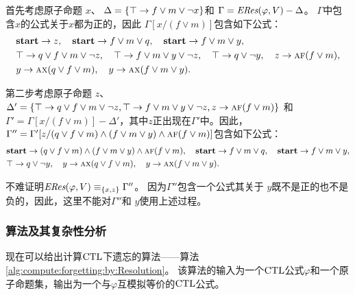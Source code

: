 \begin{example}\label{examp:Aclm}
	首先考虑原子命题 $x$、 $\Delta=\{\top \rightarrow f \vee m \vee \neg x\}$和 $\Gamma=\emph{ERes}(\varphi,V)-\Delta$。
	$\Gamma$中包含$x$的公式关于$x$都为正的，因此 $\Gamma[x/(f \vee m)]$包含如下公式：
	\begin{align*}%
		& \start\rto z, \quad \start \rto f\vee m \vee q, \quad  \start \rto f \vee m \vee y, \\
		& \top \rto q \vee f \vee m \vee \neg z, \quad 	\top \rto f \vee m \vee y \vee \neg z,
		\quad \top \rto q\vee\neg y , \quad z \rto \ALL \FUTURE (f \vee m), \\
		& y \rto \ALL\NEXT(q \vee f\vee m), %
		\quad 	y \rto \ALL\NEXT(f\vee m\vee y).
	\end{align*}
	
	第二步考虑原子命题 $z$、
	$\Delta'=\{ \top \rightarrow q \vee f \vee m \vee \neg z, \top \rightarrow f \vee m \vee y \vee \neg z ,z \rightarrow \textsc{a} \textsc{f} (f \vee m)\}$
	和 $\Gamma'=\Gamma[x/(f \vee m)] -\Delta'$，其中$z$正出现在$\Gamma'$中。因此，
	$\Gamma''=\Gamma'[z/ (q \vee f \vee m)\land (f \vee m \vee y)\land\textsc{a} \textsc{f} (f \vee m)]$包含如下公式：
	\begin{align*}%
		& \start\rto  (q \vee f \vee m)\land (f \vee m \vee y)\land\ALL \FUTURE (f \vee m),
		\quad \start \rto f\vee m \vee q, \quad  \start \rto f \vee m \vee y,  \\
		&  \top \rto q\vee\neg y,  \quad y \rto \ALL\NEXT(q \vee f\vee m), \quad y \rto \ALL\NEXT(f\vee m\vee y).
	\end{align*}
	
	不难证明$\emph{ERes}(\varphi,V)\equiv_{\{x,z\}} \Gamma''$。
	因为$\Gamma''$包含一个公式其关于 $y$既不是正的也不是负的，因此，这里不能对$\Gamma''$和 $y$使用上述过程。 
\end{example}


\subsubsection{算法及其复杂性分析}
\label{cha4:sec:alg}
现在可以给出计算$\textrm{CTL}$下遗忘的算法——算法\ref{alg:compute:forgetting:by:Resolution}。
该算法的输入为一个$\textrm{CTL}$公式$\varphi$和一个原子命题集，输出为一个与$\varphi$互模拟等价的$\textrm{CTL}$公式。
%


